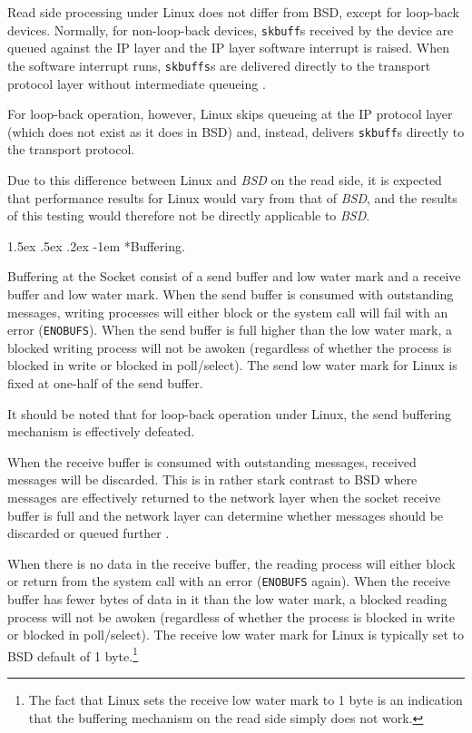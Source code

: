 \documentclass[letterpaper,final,notitlepage,twocolumn,10pt,twoside]{article}
\makeatletter
\renewcommand\paragraph{\@startsection{paragraph}{4}{\z@}%
                                    {1.5ex \@plus .5ex \@minus .2ex}%
                                    {-1em}%
                                    {\normalfont\normalsize\bfseries\slshape}}
\makeatother
\begin{document}
Read side processing under Linux does not differ from BSD, except for
loop-back devices.  Normally, for non-loop-back devices, \texttt{skbuff}s
received by the device are queued against the IP layer and the IP layer
software interrupt is raised.  When the software interrupt runs,
\texttt{skbuffs}s are delivered directly to the transport protocol layer
without intermediate queueing \cite[]{bsd}.

For loop-back operation, however, Linux skips queueing at the IP protocol
layer (which does not exist as it does in BSD) and, instead, delivers
\texttt{skbuff}s directly to the transport protocol.

Due to this difference between Linux and \textsl{BSD} on the read side, it is
expected that performance results for Linux would vary from that of
\textsl{BSD}, and the results of this testing would therefore not be
directly applicable to \textsl{BSD}.

\paragraph*{Buffering.}

Buffering at the Socket consist of a send buffer and low water mark and a
receive buffer and low water mark.  When the send buffer is consumed with
outstanding messages, writing processes will either block or the system call
will fail with an error (\texttt{ENOBUFS}).   When the send buffer is full
higher than the low water mark, a blocked writing process will not be awoken
(regardless of whether the process is blocked in write or blocked in
poll/select).  The send low water mark for Linux is fixed at one-half
of the send buffer.

It should be noted that for loop-back operation under Linux, the send
buffering mechanism is effectively defeated.

When the receive buffer is consumed with outstanding messages, received
messages will be discarded.  This is in rather stark contrast to BSD where
messages are effectively returned to the network layer when the socket receive
buffer is full and the network layer can determine whether messages should be
discarded or queued further \cite[]{bsd}.

When there is no data in the receive buffer, the reading process will either
block or return from the system call with an error (\texttt{ENOBUFS} again).
When the receive buffer has fewer bytes of data in it than the low water mark,
a blocked reading process will not be awoken (regardless of whether the
process is blocked in write or blocked in poll/select).  The receive low water
mark for Linux is typically set to BSD default of 1 byte.\footnote{The fact
that Linux sets the receive low water mark to 1 byte is an indication that the
buffering mechanism on the read side simply does not work.}
\end{document}
